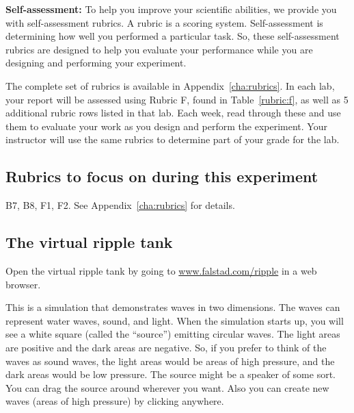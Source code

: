 
\begin{framed}
	\textbf{Self-assessment:} To help you improve your scientific abilities, we provide you with self-assessment rubrics.
	A rubric is a scoring system.
	Self-assessment is determining how well you performed a particular task.
	So, these self-assessment rubrics are designed to help you evaluate your performance while you are designing and performing your experiment.
	
	The complete set of rubrics is available in Appendix~\ref{cha:rubrics}.
	In each lab, your report will be assessed using Rubric F, found in Table~\ref{rubric:f}, as well as 5 additional rubric rows listed in that lab.
	Each week, read through these and use them to evaluate your work as you design and perform the experiment.
	Your instructor will use the same rubrics to determine part of your grade for the lab.
\end{framed}	

\subsection{Rubrics to focus on during this experiment}

B7, B8, F1, F2. See Appendix~\ref{cha:rubrics} for details.

\subsection{The virtual ripple tank}

\begin{steps}
	\item Open the virtual ripple tank by going to \url{www.falstad.com/ripple} in a web browser.
\end{steps}

This is a simulation that demonstrates waves in two dimensions. The waves can represent water waves, sound, and light. When the simulation starts up, you will see a white square (called the ``source'') emitting circular waves. The light areas are positive and the dark areas are negative. So, if you prefer to think of the waves as sound waves, the light areas would be areas of high pressure, and the dark areas would be low pressure. The source might be a speaker of some sort. You can drag the source around wherever you want. Also you can create new waves (areas of high pressure) by clicking anywhere.

